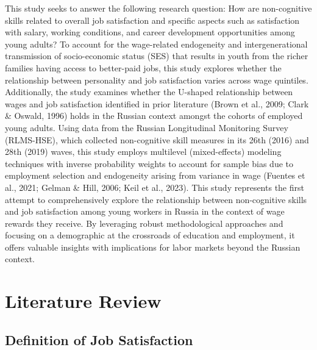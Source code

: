 \documentclass[
]{interact}
\begin{document}
This study seeks to answer the following research question: How are
non-cognitive skills related to overall job satisfaction and specific
aspects such as satisfaction with salary, working conditions, and career
development opportunities among young adults? To account for the
wage-related endogeneity and intergenerational transmission of
socio-economic status (SES) that results in youth from the richer
families having access to better-paid jobs, this study explores whether
the relationship between personality and job satisfaction varies across
wage quintiles. Additionally, the study examines whether the U-shaped
relationship between wages and job satisfaction identified in prior
literature (Brown et al., 2009; Clark \& Oswald, 1996) holds in the
Russian context amongst the cohorts of employed young adults. Using data
from the Russian Longitudinal Monitoring Survey (RLMS-HSE), which
collected non-cognitive skill measures in its 26th (2016) and 28th
(2019) waves, this study employs multilevel (mixed-effects) modeling
techniques with inverse probability weights to account for sample bias
due to employment selection and endogeneity arising from variance in
wage (Fuentes et al., 2021; Gelman \& Hill, 2006; Keil et al., 2023).
This study represents the first attempt to comprehensively explore the
relationship between non-cognitive skills and job satisfaction among
young workers in Russia in the context of wage rewards they receive. By
leveraging robust methodological approaches and focusing on a
demographic at the crossroads of education and employment, it offers
valuable insights with implications for labor markets beyond the Russian
context.

\section{Literature Review}\label{literature-review}

\subsection{Definition of Job
Satisfaction}\label{definition-of-job-satisfaction}
\end{document}
